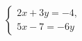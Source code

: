 \begin{ex}
	\begin{condition}
		\( \left\{
		\begin{array}{l}
			2x+3y=-4,\\
			5x-7=-6y
		\end{array}
		\right. \)
	\end{condition}
\end{ex}